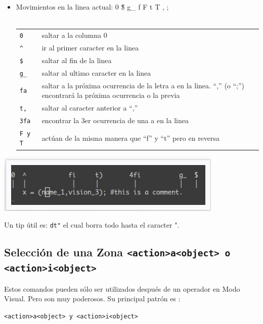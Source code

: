 \documentclass[12pt]{article}
\begin{document}
\begin{itemize}
	\item Movimientos en la linea actual:  0 \^ \$ g\_ f F t T , ; \\ \\
\begin{tabular}{ l l }
	\texttt{0} & saltar a la columna 0 \\
	\texttt{\^} & ir al primer caracter en la linea \\
	\texttt{\$} & saltar al fin de la linea \\
	\texttt{g\_} & saltar al ultimo caracter en la linea \\
	\texttt{fa} & saltar a la próxima ocurrencia de la letra a en la linea. ``,''  (o ``;'') encontrará la próxima ocurrencia o la previa \\

	\texttt{t,} & saltar al caracter anterior a ``,'' \\
	\texttt{3fa} & encontrar la 3er ocurrencia de una a en la linea \\
	\texttt{F y T} & actúan de la misma manera que ``f''  y ``t'' pero en reversa \\
\end{tabular}
\end{itemize}

\begin{center}
 \includegraphics{./img/movecurrline.jpg}
\end{center}



Un tip útil es: \texttt{dt"}  el cual borra todo hasta el caracter ".

\subsection{Selección de una Zona \texttt{<action>a<object> o <action>i<object>}}


Estos comandos pueden sólo ser utilizados después de un operador en Modo Visual. Pero son muy poderosos. Su principal patrón es :

\texttt{<action>a<object> y <action>i<object>}
\end{document}
